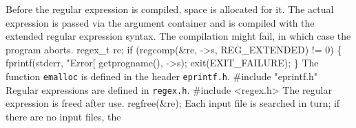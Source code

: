 Before the regular expression is compiled, space is allocated for
it. The actual expression is passed via the argument container and is
compiled with the extended regular expression syntax. The compilation
might fail, in which case the program aborts.
\nwenddocs{}\endmoddef\nwstartdeflinemarkup{}\nwenddeflinemarkup
regex_t re;
if (regcomp(&re, ->s, REG_EXTENDED) != 0) \{
  fprintf(stderr, "Error[%
            getprogname(), ->s);
  exit(EXIT_FAILURE);
\}
\nwendcode{}\nwdocspar
The function \texttt{emalloc} is defined in the header
\texttt{eprintf.h}.
\nwenddocs{}\plusendmoddef\nwstartdeflinemarkup{}\nwenddeflinemarkup
#include "eprintf.h"
\nwendcode{}\nwdocspar
Regular expressions are defined in \texttt{regex.h}.
\nwenddocs{}\plusendmoddef\nwstartdeflinemarkup{}\nwenddeflinemarkup
#include <regex.h>
\nwendcode{}\nwdocspar
The regular expression is freed after use.
\nwenddocs{}\plusendmoddef\nwstartdeflinemarkup{}\nwenddeflinemarkup
regfree(&re);
\nwendcode{}\nwdocspar
Each input file is searched in turn; if there are no input files, the
